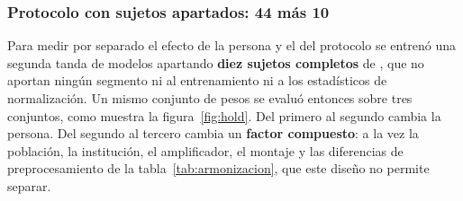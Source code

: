 \subsubsection{Protocolo con sujetos apartados: 44 más 10}

Para medir por separado el efecto de la persona y el del protocolo se entrenó una segunda
tanda de modelos apartando \textbf{diez sujetos completos} de \openbmi{}, que no aportan
ningún segmento ni al entrenamiento ni a los estadísticos de normalización. Un mismo
conjunto de pesos se evaluó entonces sobre tres conjuntos, como muestra la
figura~\ref{fig:hold}. Del primero al segundo cambia la persona. Del segundo al tercero
cambia un \textbf{factor compuesto}: a la vez la población, la institución, el amplificador,
el montaje y las diferencias de preprocesamiento de la tabla~\ref{tab:armonizacion}, que
este diseño no permite separar.

